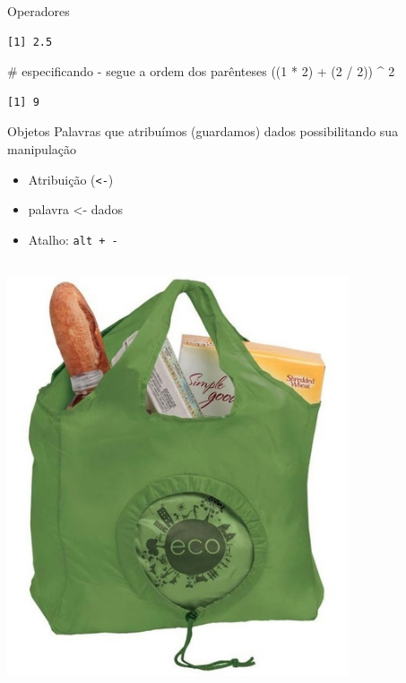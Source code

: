 \documentclass[
  ignorenonframetext,
]{beamer}
\newenvironment{Shaded}{\begin{snugshade}}{\end{snugshade}}
\newcommand{\CommentTok}[1]{\textcolor[rgb]{0.37,0.37,0.37}{#1}}
\newcommand{\DecValTok}[1]{\textcolor[rgb]{0.68,0.00,0.00}{#1}}
\newcommand{\NormalTok}[1]{\textcolor[rgb]{0.00,0.23,0.31}{#1}}
\newcommand{\SpecialCharTok}[1]{\textcolor[rgb]{0.37,0.37,0.37}{#1}}
\begin{document}
\begin{frame}[fragile]{}
\begin{block}{Operadores}
\begin{verbatim}
[1] 2.5
\end{verbatim}

\begin{Shaded}
\begin{Highlighting}[]
\CommentTok{\# especificando {-} segue a ordem dos parênteses}
\NormalTok{((}\DecValTok{1} \SpecialCharTok{*} \DecValTok{2}\NormalTok{) }\SpecialCharTok{+}\NormalTok{ (}\DecValTok{2} \SpecialCharTok{/} \DecValTok{2}\NormalTok{)) }\SpecialCharTok{\^{}} \DecValTok{2}
\end{Highlighting}
\end{Shaded}

\begin{verbatim}
[1] 9
\end{verbatim}
\end{block}

\begin{block}{Objetos}
\protect\hypertarget{objetos}{}
Palavras que atribuímos (guardamos) dados possibilitando sua manipulação

\begin{itemize}
\item
  Atribuição (\texttt{\textless{}-})
\item
  palavra \textless- dados
\item
  Atalho: \texttt{alt\ +\ -}
\end{itemize}

\includegraphics[width=3.95833in,height=5in]{img/general_assign.jpg}
\end{block}


\end{frame}
\end{document}
